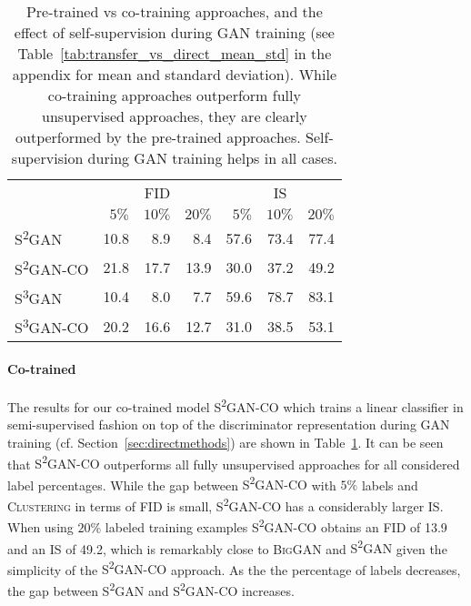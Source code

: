 \documentclass{article}
\newcommand{\cotrainSS}{\textsc{S\textsuperscript{2}GAN-CO}}
\newcommand{\cotrainSSS}{\textsc{S\textsuperscript{3}GAN-CO}}
\newcommand{\tranSS}{\textsc{S\textsuperscript{2}GAN}}
\newcommand{\tranSSS}{\textsc{S\textsuperscript{3}GAN}}
\newcommand{\tranC}{\textsc{Clustering}}
\newcommand{\biggan}{\textsc{BigGAN}}
\begin{document}
\begin{table}[h]
\caption{Pre-trained vs co-training approaches, and the effect of self-supervision during GAN training (see Table~\ref{tab:transfer_vs_direct_mean_std} in the appendix for mean and standard deviation). While co-training approaches outperform fully unsupervised approaches, they are clearly outperformed by the pre-trained approaches. Self-supervision during GAN training helps in all cases.\vspace{0.2cm}}
\centering
\setlength\tabcolsep{4.5pt}
\begin{tabular}{lrrrrrr}
\toprule
&\multicolumn{3}{c}{\textsc{FID}} & \multicolumn{3}{c}{\textsc{IS}}\\\cmidrule(lr){2-4}\cmidrule(lr){5-7}
&       $5\%$  &  $10\%$ &   $20\%$ &  $5\%$  &  $10\%$ &   $20\%$ \\
\midrule
\tranSS{}       &           10.8 &   8.9 &   8.4 &  57.6 &  73.4 &  77.4 \\
\cotrainSS	    &           21.8 &  17.7 &  13.9 &  30.0 &  37.2 &  49.2 \\\midrule
\tranSSS{}      &           10.4 &   8.0 &   7.7 &  59.6 &  78.7 &  83.1 \\
\cotrainSSS	    &           20.2 &  16.6 &  12.7 &  31.0 &  38.5 &  53.1 \\
\bottomrule
\end{tabular} \label{tab:transfer_vs_direct}
\end{table}


\paragraph{Co-trained}

The results for our co-trained model \cotrainSS{} which trains a linear classifier in semi-supervised fashion on top of the discriminator representation during GAN training (cf. Section~\ref{sec:directmethods}) are shown in Table~\ref{tab:transfer_vs_direct}. It can be seen that \cotrainSS{} outperforms all fully unsupervised approaches for all considered label percentages. While the gap between \cotrainSS{} with $5\%$ labels and \tranC{} in terms of FID is small, \cotrainSS{} has a considerably larger IS. When using $20\%$ labeled training examples \cotrainSS{} obtains an FID of 13.9 and an IS of 49.2, which is remarkably close to \biggan{} and \tranSS{} given the simplicity of the \cotrainSS{} approach. As the the percentage of labels decreases, the gap between \tranSS{} and \cotrainSS{} increases. 
\end{document}

